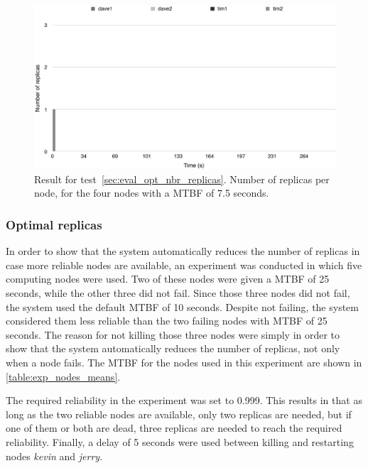 \documentclass{cslthse-msc}
\begin{document}
\begin{figure}[!hbt]
\centering
\includegraphics[scale=0.5]{images/results/optimal_replicas/MTBF_75.pdf}
\caption{Result for test~\ref{sec:eval_opt_nbr_replicas}. Number of replicas per node, for the four nodes with a MTBF of 7.5 seconds.} \label{fig:exp_opt_replicas_MTBF_75}
\end{figure}

\subsubsection{Optimal replicas}
\label{sec:eval_opt_nbr_replicas_2}
In order to show that the system automatically reduces the number of replicas in case more reliable nodes are available, an experiment was conducted in which five computing nodes were used. Two of these nodes were given a MTBF of 25 seconds, while the other three did not fail. Since those three nodes did not fail, the system used the default MTBF of 10 seconds. Despite not failing, the system considered them less reliable than the two failing nodes with MTBF of 25 seconds. The reason for not killing those three nodes were simply in order to show that the system automatically reduces the number of replicas, not only when a node fails. The MTBF for the nodes used in this experiment are shown in \cref{table:exp_nodes_means}.

The required reliability in the experiment was set to 0.999. This results in that as long as the two reliable nodes are available, only two replicas are needed, but if one of them or both are dead, three replicas are needed to reach the required reliability. Finally, a delay of 5 seconds were used between killing and restarting nodes \emph{kevin} and \emph{jerry}.
\end{document}
